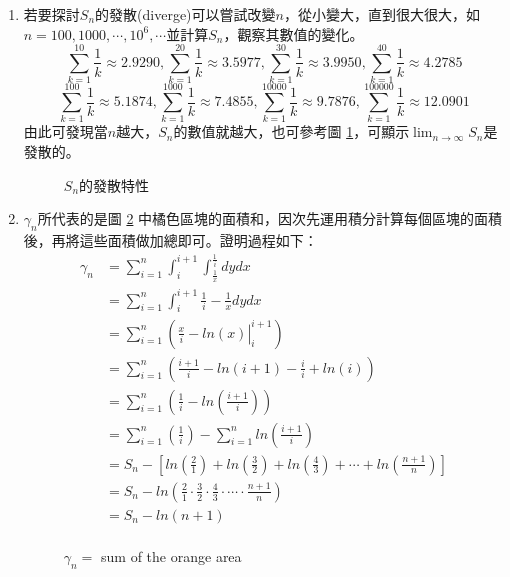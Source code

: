 \begin{enumerate}
\item 
若要探討$S_n$的發散(diverge)可以嘗試改變$n$，從小變大，直到很大很大，如$n=100, 1000, \cdots, 10^6, \cdots $並計算$S_n$，觀察其數值的變化。\\
$$\sum_{k=1}^{10}\frac{1}{k}\approx 2.9290,\sum_{k=1}^{20}\frac{1}{k}\approx 3.5977,\sum_{k=1}^{30}\frac{1}{k}\approx 3.9950,\sum_{k=1}^{40}\frac{1}{k}\approx 4.2785$$
$$\sum_{k=1}^{100}\frac{1}{k}\approx 5.1874,\sum_{k=1}^{1000}\frac{1}{k}\approx 7.4855,\sum_{k=1}^{10000}\frac{1}{k}\approx 9.7876,\sum_{k=1}^{100000}\frac{1}{k}\approx 12.0901$$
由此可發現當$n$越大，$S_n$的數值就越大，也可參考圖 \ref{fig:Sn}，可顯示$\lim_{n\rightarrow \infty} S_n$是發散的。
\begin{figure}[H]
    \caption{$S_n$的發散特性}
    \label{fig:Sn}
\end{figure}
\item $\gamma_n$所代表的是圖 \ref{fig:riemannsum} 中橘色區塊的面積和，因次先運用積分計算每個區塊的面積後，再將這些面積做加總即可。證明過程如下：
\begin{align*}
\gamma_n &=\sum_{i=1}^n\int_{i}^{i+1} \int_{\frac{1}{x}}^{\frac{1}{i}}dydx \\
         &=\sum_{i=1}^n\int_{i}^{i+1} \frac{1}{i}-\frac{1}{x}dydx \\
         &=\sum_{i=1}^n\left(\left. \frac{x}{i}-ln(x)\right|_{i}^{i+1}\right)\\
         &=\sum_{i=1}^n\left( \frac{i+1}{i}-ln(i+1)-\frac{i}{i}+ln(i)\right) \\
         &=\sum_{i=1}^n\left( \frac{1}{i}-ln\left(\frac{i+1}{i}\right)\right)  \\
         &=\sum_{i=1}^n\left(\frac{1}{i}\right) -\sum_{i=1}^nln\left(\frac{i+1}{i}\right) \\
         &=S_n-\left[ln\left(\frac{2}{1}\right)+ln\left(\frac{3}{2}\right)+ln\left(\frac{4}{3}\right)+\cdots+ln\left(\frac{n+1}{n}\right)\right]\\
         &=S_n-ln\left(\frac{2}{1}\cdot \frac{3}{2}\cdot \frac{4}{3}\cdot \cdots \cdot \frac{n+1}{n}\right)\\
         &=S_n-ln\left(n+1\right)\\
\end{align*}
\begin{figure}[H]
    \caption{$\gamma_n=$ sum of the orange area}
    \label{fig:riemannsum}

\end{figure}
\end{enumerate}
